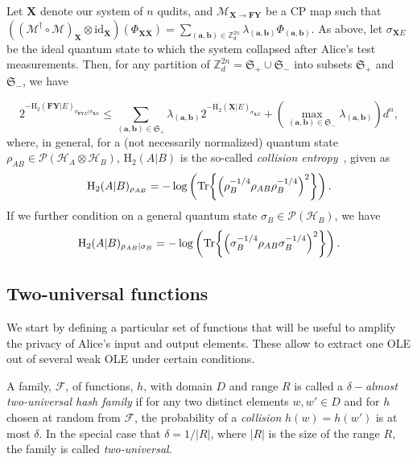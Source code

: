 \begin{lemma} 
\label{thm:entaglementSamplingResult}
Let $\mathbf{X}$ denote our system of  $n$ qudits, and  $\mathcal{M}_{\mathbf{X}\rightarrow \mathbf{F}\mathbf{Y}}$ be a CP map such that $((\mathcal{M}^\dagger \circ \mathcal{M})_{\mathbf{X}}\otimes \text{id}_{\bar{\mathbf{X}}})(\Phi_{\mathbf{X}\bar{\mathbf{X}}}) = \sum_{(\bm{a},\bm{b})\in\mathbb{Z}^{2n}_d} \lambda_{(\bm{a},\bm{b})} \Phi_{(\bm{a},\bm{b})}$. As above, let $\sigma_{\mathbf{X} E}$ be the ideal quantum state to which the system collapsed after Alice's test measurements.  Then, for any partition of $\mathbb{Z}^{2n}_d = \mathfrak{S}_+ \cup \mathfrak{S}_-$ into subsets $\mathfrak{S}_+$ and $\mathfrak{S}_-$, we have 

\begin{equation}
    2^{-\text{H}_2(\mathbf{F}\mathbf{Y} | E)_{\sigma_{\mathbf{F}\mathbf{Y}E} | \sigma_{\mathbf{X}E}}} \leq \sum_{(\bm{a},\bm{b})\in\mathfrak{S}_+} \lambda_{(\bm{a},\bm{b})} 2^{-\text{H}_2(\mathbf{X} | E)_{\sigma_{\mathbf{X}E}}} + (\max_{(\bm{a},\bm{b})\in\mathfrak{S}_-} \lambda_{(\bm{a},\bm{b})}) d^n,
\end{equation}
 where, in general, for a (not necessarily normalized) quantum state $\rho_{AB}\in \mathcal{P}(\mathcal{H}_A\otimes\mathcal{H}_B)$, $\text{H}_2(A|B)$   is the so-called \textit{collision entropy}~\cite{R06}, given as 
\begin{equation*} 
    \text{H}_2(A|B)_{\rho_{AB}}=-\log \left(\Tr{\left(\rho_{B}^{-1/4}\rho_{AB}\rho_B^{-1/4}\right)^2}\right).
\end{equation*}
If we further condition on a general quantum state $\sigma_B\in\mathcal{P}(\mathcal{H}_B)$, we have 
\begin{equation*}
    \text{H}_2(A|B)_{\rho_{AB}|\sigma_B}=-\log \left(\Tr{\left(\sigma_{B}^{-1/4}\rho_{AB}\sigma_B^{-1/4}\right)^2}\right).
\end{equation*}
\end{lemma}


\subsection{Two-universal functions}

We start by defining a particular set of functions that will be useful to amplify the privacy of Alice's input and output elements. These allow to extract one OLE out of several weak OLE under certain conditions.


\begin{definition}
A family, $\mathcal{F}$, of functions, $h$, with domain $D$ and range $R$ is called a \textit{$\delta-$almost two-universal hash family} if for any two distinct elements $w,w'\in D$ and for $h$ chosen at random from $\mathcal{F}$, the probability of a \textit{collision} $h(w)=h(w')$ is at most $\delta$. In the special case that $\delta=1/|R|$, where $|R|$ is the size of the range $R$, the family is called \textit{two-universal}. 
\end{definition}

